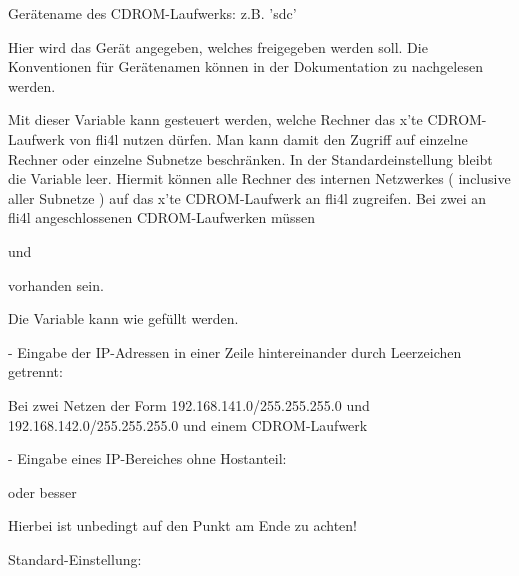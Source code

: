 \begin{description}

    Gerätename des CDROM-Laufwerks: z.B. 'sdc'

        Hier wird das Gerät angegeben, welches freigegeben werden soll.
        Die Konventionen für Gerätenamen können in der Dokumentation zu
         nachgelesen werden.

\end{description}

\begin{description}

        Mit dieser Variable kann gesteuert werden, welche Rechner das x'te
        CDROM-Laufwerk von fli4l nutzen dürfen. Man kann damit den Zugriff auf
        einzelne Rechner oder einzelne Subnetze beschränken.
        In der Standardeinstellung bleibt die Variable leer. Hiermit können
        alle Rechner des internen Netzwerkes ( inclusive aller Subnetze )
        auf das x'te CDROM-Laufwerk an fli4l zugreifen.
        Bei zwei an fli4l angeschlossenen CDROM-Laufwerken müssen


          und


        vorhanden sein.

        Die Variable kann wie  gefüllt werden.

        - Eingabe der IP-Adressen in einer Zeile hintereinander
          durch Leerzeichen getrennt:


        Bei zwei Netzen der Form 192.168.141.0/255.255.255.0 und
        192.168.142.0/255.255.255.0 und einem CDROM-Laufwerk

        - Eingabe eines IP-Bereiches ohne Hostanteil:


          oder besser


          Hierbei ist unbedingt auf den Punkt am Ende zu achten!

        Standard-Einstellung: 

\end{description}

